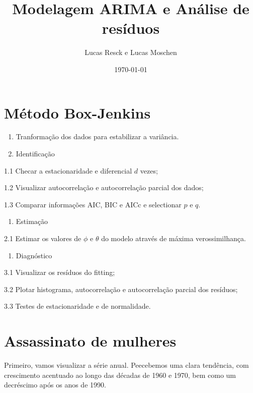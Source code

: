\documentclass[]{article}
\title{Modelagem ARIMA e Análise de resíduos}
\author{Lucas Resck e Lucas Moschen}
\date{\today}
\providecommand{\tightlist}{%
  \setlength{\itemsep}{0pt}\setlength{\parskip}{0pt}}
\begin{document}
\maketitle

\hypertarget{muxe9todo-box-jenkins}{%
\section{Método Box-Jenkins}\label{muxe9todo-box-jenkins}}

\begin{enumerate}
\def\labelenumi{\arabic{enumi}.}
\setcounter{enumi}{-1}
\item
  Tranformação dos dados para estabilizar a variância.
\item
  Identificação
\end{enumerate}

1.1 Checar a estacionaridade e diferencial \(d\) vezes;

1.2 Visualizar autocorrelação e autocorrelação parcial dos dados;

1.3 Comparar informações AIC, BIC e AICc e selectionar \(p\) e \(q\).

\begin{enumerate}
\def\labelenumi{\arabic{enumi}.}
\setcounter{enumi}{1}
\tightlist
\item
  Estimação
\end{enumerate}

2.1 Estimar os valores de \(\phi\) e \(\theta\) do modelo através de
máxima verossimilhança.

\begin{enumerate}
\def\labelenumi{\arabic{enumi}.}
\setcounter{enumi}{2}
\tightlist
\item
  Diagnóstico
\end{enumerate}

3.1 Visualizar os resíduos do fitting;

3.2 Plotar histograma, autocorrelação e autocorrelação parcial dos
resíduos;

3.3 Testes de estacionaridade e de normalidade.

\hypertarget{assassinato-de-mulheres}{%
\section{Assassinato de mulheres}\label{assassinato-de-mulheres}}

Primeiro, vamos visualizar a série anual. Peecebemos uma clara
tendência, com crescimento acentuado ao longo das décadas de 1960 e
1970, bem como um decréscimo após os anos de 1990.
\end{document}
